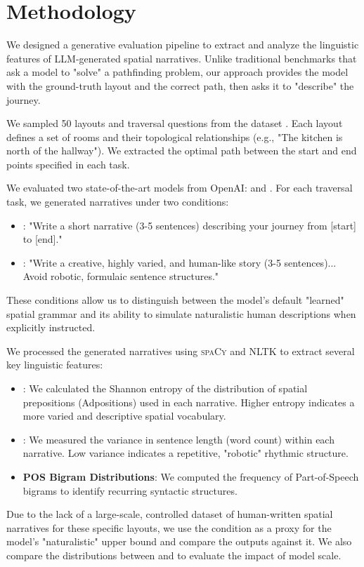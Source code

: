 \section{Methodology}
\label{sec:method}

We designed a generative evaluation pipeline to extract and analyze the linguistic features of LLM-generated spatial narratives. Unlike traditional benchmarks that ask a model to "solve" a pathfinding problem, our approach provides the model with the ground-truth layout and the correct path, then asks it to "describe" the journey.

We sampled 50 layouts and traversal questions from the \babitask dataset \cite{weston2015towards}. Each layout defines a set of rooms and their topological relationships (e.g., "The kitchen is north of the hallway"). We extracted the optimal path between the start and end points specified in each task.

We evaluated two state-of-the-art models from OpenAI: \gpto and \gptom. For each traversal task, we generated narratives under two conditions:
\begin{itemize}[leftmargin=*,itemsep=0pt,topsep=0pt]
    \item \standardprompt: "Write a short narrative (3-5 sentences) describing your journey from [start] to [end]."
    \item \humanprompt: "Write a creative, highly varied, and human-like story (3-5 sentences)... Avoid robotic, formulaic sentence structures."
\end{itemize}
These conditions allow us to distinguish between the model's default "learned" spatial grammar and its ability to simulate naturalistic human descriptions when explicitly instructed.

We processed the generated narratives using \textsc{spaCy} and \textsc{NLTK} to extract several key linguistic features:
\begin{itemize}[leftmargin=*,itemsep=0pt,topsep=0pt]
    \item {\bf \prepentropy}: We calculated the Shannon entropy of the distribution of spatial prepositions (Adpositions) used in each narrative. Higher entropy indicates a more varied and descriptive spatial vocabulary.
    \item {\bf \sentvar}: We measured the variance in sentence length (word count) within each narrative. Low variance indicates a repetitive, "robotic" rhythmic structure.
    \item {\bf POS Bigram Distributions}: We computed the frequency of Part-of-Speech bigrams to identify recurring syntactic structures.
\end{itemize}

Due to the lack of a large-scale, controlled dataset of human-written spatial narratives for these specific layouts, we use the \humanprompt condition as a proxy for the model's "naturalistic" upper bound and compare the \standardprompt outputs against it. We also compare the distributions between \gpto and \gptom to evaluate the impact of model scale.
